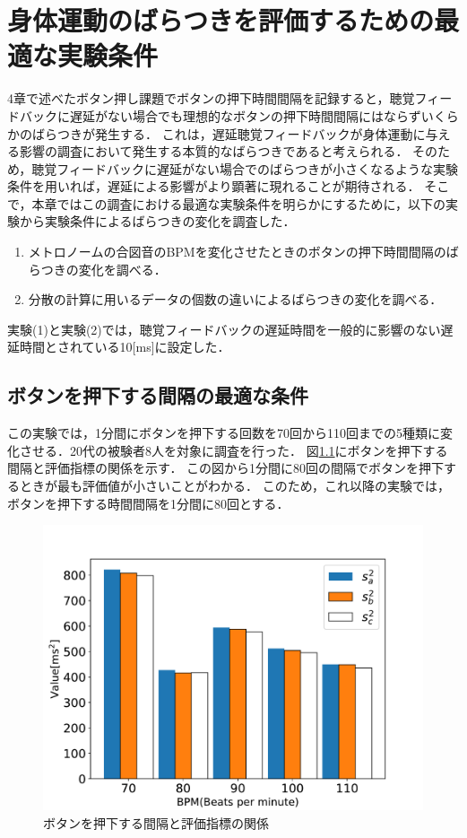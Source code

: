 \chapter{身体運動のばらつきを評価するための最適な実験条件}
4章で述べたボタン押し課題でボタンの押下時間間隔を記録すると，聴覚フィードバックに遅延がない場合でも理想的なボタンの押下時間間隔にはならずいくらかのばらつきが発生する．
これは，遅延聴覚フィードバックが身体運動に与える影響の調査において発生する本質的なばらつきであると考えられる．
そのため，聴覚フィードバックに遅延がない場合でのばらつきが小さくなるような実験条件を用いれば，遅延による影響がより顕著に現れることが期待される．
そこで，本章ではこの調査における最適な実験条件を明らかにするために，以下の実験から実験条件によるばらつきの変化を調査した．
\begin{enumerate}[leftmargin=*, label=実験(\arabic*)] %
  \item メトロノームの合図音のBPMを変化させたときのボタンの押下時間間隔のばらつきの変化を調べる．
  \item 分散の計算に用いるデータの個数の違いによるばらつきの変化を調べる．
\end{enumerate}
実験(1)と実験(2)では，聴覚フィードバックの遅延時間を一般的に影響のない遅延時間とされている10[ms]に設定した．
\section{ボタンを押下する間隔の最適な条件}
この実験では，1分間にボタンを押下する回数を70回から110回までの5種類に変化させる．20代の被験者8人を対象に調査を行った．
図\ref{fig:bpm}にボタンを押下する間隔と評価指標の関係を示す．
この図から1分間に80回の間隔でボタンを押下するときが最も評価値が小さいことがわかる．
このため，これ以降の実験では，ボタンを押下する時間間隔を1分間に80回とする．
\begin{figure}[btp]
  \centering
  \includegraphics[scale=0.6]{figures/Yobi/Var/BPM-Change-Var.pdf}
  \caption{ボタンを押下する間隔と評価指標の関係}
  \label{fig:bpm}
\end{figure}
